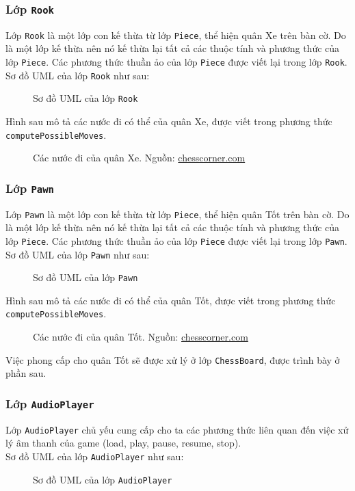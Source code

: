 \subsubsection{Lớp \lstinline{Rook}}
Lớp \lstinline{Rook} là một lớp con kế thừa từ lớp \lstinline{Piece}, thể hiện quân Xe trên bàn cờ. Do là một lớp kế thừa nên nó kế thừa lại tất cả các thuộc tính và phương thức của lớp \lstinline{Piece}. Các phương thức thuần ảo của lớp \lstinline{Piece} được viết lại trong lớp \lstinline{Rook}.\\
Sơ đồ UML của lớp \lstinline{Rook} như sau:
\begin{figure}[H]
\caption{Sơ đồ UML của lớp \lstinline{Rook}}
\end{figure}
Hình sau mô tả các nước đi có thể của quân Xe, được viết trong phương thức \lstinline{computePossibleMoves}.
\begin{figure}[H]
\caption{Các nước đi của quân Xe. Nguồn: \url{chesscorner.com}}
\end{figure}
\subsubsection{Lớp \lstinline{Pawn}}
Lớp \lstinline{Pawn} là một lớp con kế thừa từ lớp \lstinline{Piece}, thể hiện quân Tốt trên bàn cờ. Do là một lớp kế thừa nên nó kế thừa lại tất cả các thuộc tính và phương thức của lớp \lstinline{Piece}. Các phương thức thuần ảo của lớp \lstinline{Piece} được viết lại trong lớp \lstinline{Pawn}.\\
Sơ đồ UML của lớp \lstinline{Pawn} như sau:
\begin{figure}[H]
\caption{Sơ đồ UML của lớp \lstinline{Pawn}}
\end{figure}
Hình sau mô tả các nước đi có thể của quân Tốt, được viết trong phương thức \lstinline{computePossibleMoves}.
\begin{figure}[H]
\caption{Các nước đi của quân Tốt. Nguồn: \url{chesscorner.com}}
\end{figure}
Việc phong cấp cho quân Tốt sẽ được xử lý ở lớp \lstinline{ChessBoard}, được trình bày ở phần sau.
\subsubsection{Lớp \lstinline{AudioPlayer}}
Lớp \lstinline{AudioPlayer} chủ yếu cung cấp cho ta các phương thức liên quan đến việc xử lý âm thanh của game (load, play, pause, resume, stop).\\
Sơ đồ UML của lớp \lstinline{AudioPlayer} như sau:
\begin{figure}[H]
\caption{Sơ đồ UML của lớp \lstinline{AudioPlayer}}
\end{figure}
